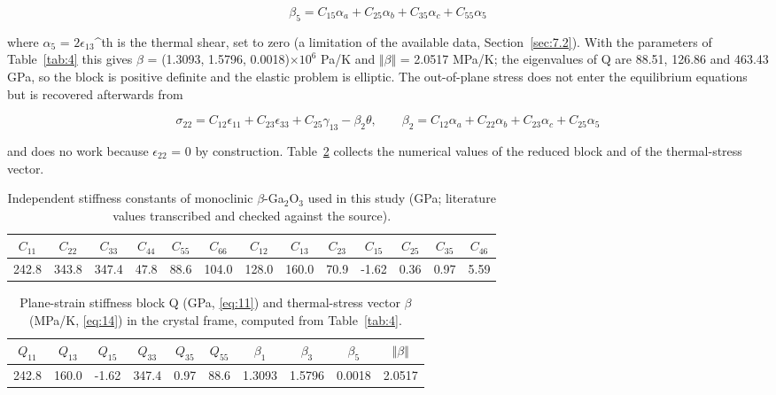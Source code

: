 \documentclass[preprint,12pt]{elsarticle}
\begin{document}
\begin{equation}
\beta_5=C_{15}\alpha_a+C_{25}\alpha_b+C_{35}\alpha_c+C_{55}\alpha_5 
\label{eq:16}
\end{equation}

where $\alpha_{5}$ = $2\epsilon_{13}$^{th} is the thermal shear, set to zero (a limitation of the available data, Section~\ref{sec:7.2}). With the parameters of Table~\ref{tab:4} this gives $\beta$ = (1.3093, 1.5796, 0.0018)$\times 10^{6}$ Pa/K and $\Vert \beta \Vert$ = 2.0517 MPa/K; the eigenvalues of Q are 88.51, 126.86 and 463.43 GPa, so the block is positive definite and the elastic problem is elliptic. The out-of-plane stress does not enter the equilibrium equations but is recovered afterwards from

\begin{equation}
\sigma_{22}=C_{12}\epsilon_{11}+C_{23}\epsilon_{33}+C_{25}\gamma_{13}-\beta_2\theta,\qquad \beta_2=C_{12}\alpha_a+C_{22}\alpha_b+C_{23}\alpha_c+C_{25}\alpha_5 
\label{eq:17}
\end{equation}

and does no work because $\epsilon_{22}$ = 0 by construction. Table~\ref{tab:2} collects the numerical values of the reduced block and of the thermal-stress vector.

\begin{table}[htbp]
\centering
\caption{Independent stiffness constants of monoclinic $\beta$-Ga$_2$O$_3$ used in this study (GPa; literature values \cite{adachi2018} transcribed and checked against the source).}
\label{tab:1}
\begin{tabular}{ccccccccccccc}
\toprule
$C_{11}$ & $C_{22}$ & $C_{33}$ & $C_{44}$ & $C_{55}$ & $C_{66}$ & $C_{12}$ & $C_{13}$ & $C_{23}$ & $C_{15}$ & $C_{25}$ & $C_{35}$ & $C_{46}$ \\
\midrule
242.8 & 343.8 & 347.4 & 47.8 & 88.6 & 104.0 & 128.0 & 160.0 & 70.9 & -1.62 & 0.36 & 0.97 & 5.59 \\
\bottomrule
\end{tabular}
\end{table}

\begin{table}[htbp]
\centering
\caption{Plane-strain stiffness block Q (GPa, \eqref{eq:11}) and thermal-stress vector $\beta$ (MPa/K, \eqref{eq:14}) in the crystal frame, computed from Table~\ref{tab:4}.}
\label{tab:2}
\begin{tabular}{cccccccccc}
\toprule
$Q_{11}$ & $Q_{13}$ & $Q_{15}$ & $Q_{33}$ & $Q_{35}$ & $Q_{55}$ & $\beta_{1}$ & $\beta_{3}$ & $\beta_{5}$ & $\Vert \beta \Vert$ \\
\midrule
242.8 & 160.0 & -1.62 & 347.4 & 0.97 & 88.6 & 1.3093 & 1.5796 & 0.0018 & 2.0517 \\
\bottomrule
\end{tabular}
\end{table}
\end{document}
